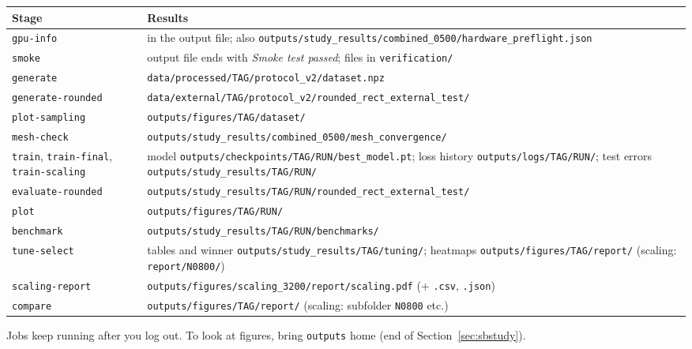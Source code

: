 \documentclass[11pt,a4paper]{article}
\newcommand{\code}[1]{\lstinline{#1}}
\begin{document}
\begin{center}
\small
\begin{tabularx}{\textwidth}{@{}lY@{}}
\toprule
Stage & Results \\
\midrule
\code{gpu-info}         & in the output file; also \code{outputs/study_results/combined_0500/hardware_preflight.json} \\
\code{smoke}            & output file ends with \emph{Smoke test passed}; files in \code{verification/} \\
\code{generate}         & \code{data/processed/TAG/protocol_v2/dataset.npz} \\
\code{generate-rounded} & \code{data/external/TAG/protocol_v2/rounded_rect_external_test/} \\
\code{plot-sampling}    & \code{outputs/figures/TAG/dataset/} \\
\code{mesh-check}       & \code{outputs/study_results/combined_0500/mesh_convergence/} \\
\code{train}, \code{train-final}, \code{train-scaling}
                        & model \code{outputs/checkpoints/TAG/RUN/best_model.pt};
                          loss history \code{outputs/logs/TAG/RUN/}; test errors
                          \code{outputs/study_results/TAG/RUN/} \\
\code{evaluate-rounded} & \code{outputs/study_results/TAG/RUN/rounded_rect_external_test/} \\
\code{plot}             & \code{outputs/figures/TAG/RUN/} \\
\code{benchmark}        & \code{outputs/study_results/TAG/RUN/benchmarks/} \\
\code{tune-select}      & tables and winner \code{outputs/study_results/TAG/tuning/};
                          heatmaps \code{outputs/figures/TAG/report/} (scaling: \code{report/N0800/}) \\
\code{scaling-report}   & \code{outputs/figures/scaling_3200/report/scaling.pdf} (+ \code{.csv}, \code{.json}) \\
\code{compare}          & \code{outputs/figures/TAG/report/} (scaling: subfolder \code{N0800} etc.) \\
\bottomrule
\end{tabularx}
\end{center}

Jobs keep running after you log out. To look at figures, bring \code{outputs} home
(end of Section~\ref{sec:sbstudy}).

\end{document}

